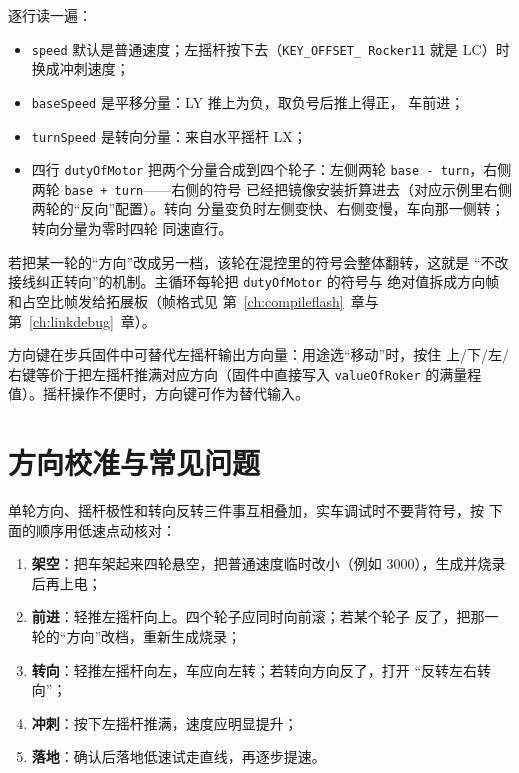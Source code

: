 逐行读一遍：

\begin{itemize}
  \item \texttt{speed} 默认是普通速度；左摇杆按下去（\texttt{KEY\_OFFSET\_
        Rocker11} 就是 LC）时换成冲刺速度；
  \item \texttt{baseSpeed} 是平移分量：LY 推上为负，取负号后推上得正，
        车前进；
  \item \texttt{turnSpeed} 是转向分量：来自水平摇杆 LX；
  \item 四行 \texttt{dutyOfMotor} 把两个分量合成到四个轮子：左侧两轮
        \texttt{base - turn}，右侧两轮 \texttt{base + turn}——右侧的符号
        已经把镜像安装折算进去（对应示例里右侧两轮的“反向”配置）。转向
        分量变负时左侧变快、右侧变慢，车向那一侧转；转向分量为零时四轮
        同速直行。
\end{itemize}

若把某一轮的“方向”改成另一档，该轮在混控里的符号会整体翻转，这就是
“不改接线纠正转向”的机制。主循环每轮把 \texttt{dutyOfMotor} 的符号与
绝对值拆成方向帧和占空比帧发给拓展板（帧格式见
第~\ref{ch:compileflash}~章与第~\ref{ch:linkdebug}~章）。

\begin{remark}
方向键在步兵固件中可替代左摇杆输出方向量：用途选“移动”时，按住
上/下/左/右键等价于把左摇杆推满对应方向（固件中直接写入
\texttt{valueOfRoker} 的满量程值）。摇杆操作不便时，方向键可作为替代输入。
\end{remark}

\section{方向校准与常见问题}
\label{sec:ch03-calibrate}

单轮方向、摇杆极性和转向反转三件事互相叠加，实车调试时不要背符号，按
下面的顺序用低速点动核对：

\begin{enumerate}
  \item \textbf{架空}：把车架起来四轮悬空，把普通速度临时改小（例如
        3000），生成并烧录后再上电；
  \item \textbf{前进}：轻推左摇杆向上。四个轮子应同时向前滚；若某个轮子
        反了，把那一轮的“方向”改档，重新生成烧录；
  \item \textbf{转向}：轻推左摇杆向左，车应向左转；若转向方向反了，打开
        “反转左右转向”；
  \item \textbf{冲刺}：按下左摇杆推满，速度应明显提升；
  \item \textbf{落地}：确认后落地低速试走直线，再逐步提速。
\end{enumerate}

